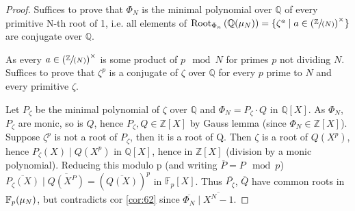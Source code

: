 \begin{proof}
  Suffices to prove that $\Phi_N$ is the minimal polynomial over $\mathbb{Q}$ of every primitive N-th root of 1, i.e. all elements of $\rootset[\Phi_n]{\mathbb{Q}(\unityroots{N})} = \{ \zeta^a \mid a \in \multCyclicGp{N} \}$ are conjugate over $\mathbb{Q}$.

As every $a \in \multCyclicGp{N}$ is some product of $p \mod N$ for primes $p$ not dividing $N$. Suffices to prove that $\zeta^p$ is a conjugate of $\zeta$ over $\mathbb{Q}$ for every $p$ prime to $N$ and every primitive $\zeta$.

Let $P_\zeta$ be the minimal polynomial of $\zeta$ over $\mathbb{Q}$ and $\Phi_N = P_\zeta\cdot{}Q$ in $\mathbb{Q}[X]$. As $\Phi_N$, $P_\zeta$ are monic, so is $Q$, hence $P_\zeta, Q \in \mathbb{Z}[X]$ by Gauss lemma (since $\Phi_N \in \mathbb{Z}[X]$). Suppose $\zeta^p$ is not a root of $P_\zeta$, then it is a root of Q. Then $\zeta$ is a root of $Q(X^p)$, hence $P_\zeta(X) \mid Q(X^p)$ in $\mathbb{Q}[X]$, hence in $\mathbb{Z}[X]$ (division by a monic polynomial). Reducing this modulo p (and writing $\overline{P} = P \mod p$) $\overline{P_\zeta(X)} \mid \overline{Q(X^P)} = (\overline{Q(X)})^p$ in $\mathbb{F}_p[X]$. Thus $\overline{P_\zeta}$, $\overline{Q}$ have common roots in $\mathbb{F}_p(\unityroots{N})$, but contradicts cor \ref{cor:62} since $\overline{\Phi_N} \mid \overline{X^N-1}$.
\end{proof}


